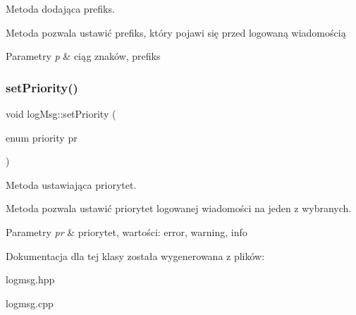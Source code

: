 Metoda dodająca prefiks. 

Metoda pozwala ustawić prefiks, który pojawi się przed logowaną wiadomością 
\begin{DoxyParams}{Parametry}
{\em p} & ciąg znaków, prefiks \\
\hline
\end{DoxyParams}
\mbox{\label{classlog_msg_a5877fcab52fdf21e293997e32219724f}} 
\subsubsection{\texorpdfstring{set\+Priority()}{setPriority()}}
{\footnotesize\ttfamily void log\+Msg\+::set\+Priority (\begin{DoxyParamCaption}\item[{enum priority}]{pr }\end{DoxyParamCaption})}



Metoda ustawiająca priorytet. 

Metoda pozwala ustawić priorytet logowanej wiadomości na jeden z wybranych. 
\begin{DoxyParams}{Parametry}
{\em pr} & priorytet, wartości\+: error, warning, info \\
\hline
\end{DoxyParams}


Dokumentacja dla tej klasy została wygenerowana z plików\+:\begin{DoxyCompactItemize}
\item 
logmsg.\+hpp\item 
logmsg.\+cpp\end{DoxyCompactItemize}
